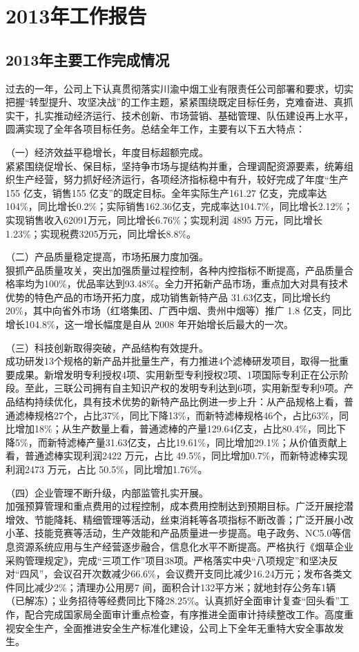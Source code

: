 ﻿\chapter{2013年工作报告}
\section{2013年主要工作完成情况}\sanhao
\indent 过去的一年，公司上下认真贯彻落实川渝中烟工业有限责任公司部署和要求，切实把握“转型提升、攻坚决战”的工作主题，紧紧围绕既定目标任务，克难奋进、真抓实干，扎实推动经济运行、技术创新、市场营销、基础管理、队伍建设再上水平，圆满实现了全年各项目标任务。总结全年工作，主要有以下五大特点：


（一）经济效益平稳增长，年度目标超额完成。\\
\indent 紧紧围绕促增长、保目标，坚持争市场与提结构并重，合理调配资源要素，统筹组织生产经营，努力抓好经济运行，各项经济指标稳中有升，较好完成了年度“生产 155 亿支，销售155 亿支”的既定目标。全年实际生产161.27 亿支，完成率达104\%，同比增长0.2\%；实际销售162.36亿支，完成率达104.7\%，同比增长2.12\%；实现销售收入62091万元，同比增长6.76\%；实现利润 4895 万元，同比增长1.23\%；实现税费3205万元，同比增长8.8\%。


（二）产品质量稳定提高，市场拓展力度加强。\\
\indent 狠抓产品质量攻关，突出加强质量过程控制，各种内控指标不断提高，产品质量合格率均为100\%，优品率达到93.48\%。全力开拓新产品市场，重点加大对具有技术优势的特色产品的市场开拓力度，成功销售新特产品 31.63亿支，同比增长约 20\%，其中向省外市场（红塔集团、广西中烟、贵州中烟等）推广 1.8 亿支，同比增长104.8\%，这一增长幅度是自从 2008 年开始增长后最大的一次。


（三）科技创新取得突破，产品结构有效提升。\\
\indent 成功研发13个规格的新产品并批量生产，有力推进4个滤棒研发项目，取得一批重要成果。新增发明专利授权4项、实用新型专利授权2项、1项国际专利正在公示阶段。至此，三联公司拥有自主知识产权的发明专利达到6项，实用新型专利9项。产品结构持续优化，具有技术优势的新特产品比例进一步上升：从产品规格上看，普通滤棒规格27个，占比37\%，同比下降13\%，而新特滤棒规格46个，占比63\%，同比增加18\%；从生产数量上看，普通滤棒的产量129.64亿支，占比80.4\%，同比下降5\%，而新特滤棒产量31.63亿支，占比19.61\%，同比增加29.1\%；从价值贡献上看，普通滤棒实现利润2422 万元，占比 49.5\%，同比增加0.7\%，而新特滤棒实现利润2473 万元，占比 50.5\%，同比增加1.76\%。

（四）企业管理不断升级，内部监管扎实开展。\\
\indent 加强预算管理和重点费用的过程控制，成本费用控制达到预期目标。广泛开展挖潜增效、节能降耗、精细管理等活动，丝束消耗等各项指标不断改善；广泛开展小改小革、技能竞赛等活动，生产效能和产品质量进一步提高。电子政务、NC5.0等信息资源系统应用与生产经营逐步融合，信息化水平不断提高。严格执行《烟草企业采购管理规定》，完成“三项工作”项目38项。严格落实中央“八项规定”和坚决反对“四风”，会议召开次数减少66.6\%，会议费开支同比减少16.24万元；发布各类文件同比减少2\%；清理办公用房7 间，面积合计132平方米；就地封存公务车1辆（已解冻）；业务招待等经费同比下降28.25\%。认真抓好全面审计复查“回头看”工作，配合完成国家局全面审计重点检查，有序推进全面审计持续整改工作。高度重视安全生产，全面推进安全生产标准化建设，公司上下全年无重特大安全事故发生。

